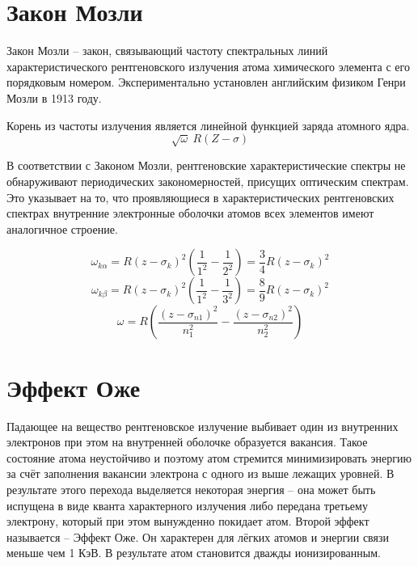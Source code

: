\section{Закон Мозли}
Закон Мозли -- закон, связывающий частоту спектральных линий 
характеристического рентгеновского излучения атома химического 
элемента с его порядковым номером. Экспериментально установлен 
английским физиком Генри Мозли в 1913 году.

Корень из частоты излучения является линейной функцией заряда атомного ядра.
\[ \sqrt\omega ~ R(Z-\sigma) \]

В соответствии с Законом Мозли, рентгеновские характеристические 
спектры не обнаруживают периодических закономерностей, присущих 
оптическим спектрам. Это указывает на то, что проявляющиеся в 
характеристических рентгеновских спектрах внутренние электронные оболочки 
атомов всех элементов имеют аналогичное строение.

\[
	\omega_{k\alpha} = R(z-\sigma_k)^2(\frac{1}{1^2} - \frac{1}{2^2}) =
	\frac{3}{4}R(z-\sigma_k)^2
\]
\[
	\omega_{k\beta} = R(z-\sigma_k)^2(\frac{1}{1^2} - \frac{1}{3^2}) = 
	\frac{8}{9}R(z-\sigma_k)^2
\]
\[ 
	\omega = R\left( \frac{(z-\sigma_{n1})^2}{n^2_1} -
	\frac{(z-\sigma_{n2})^2}{n^2_2}\right)
\]

\section{Эффект Оже}
Падающее на вещество рентгеновское излучение выбивает один из внутренних 
электронов при этом на внутренней оболочке образуется вакансия. Такое 
состояние атома неустойчиво и поэтому атом стремится минимизировать энергию 
за счёт заполнения вакансии электрона с одного из выше лежащих уровней. В 
результате этого перехода выделяется некоторая энергия -- она может быть 
испущена в виде кванта характерного излучения либо передана третьему электрону, 
который при этом вынужденно покидает атом. Второй эффект называется -- 
Эффект Оже. Он характерен для лёгких атомов и энергии связи меньше чем 1 КэВ. 
В результате атом становится дважды ионизированным. 


\newpage
